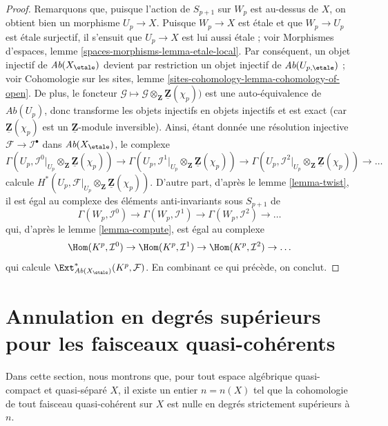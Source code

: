 \begin{proof}
Remarquons que, puisque l'action de $S_{p + 1}$ sur $W_p$ est au-dessus de $X$, on
obtient bien un morphisme $U_p \to X$. Puisque $W_p \to X$ est \'etale et que
$W_p \to U_p$ est \'etale surjectif, il s'ensuit
que $U_p \to X$ est lui aussi \'etale ; voir
Morphismes d'espaces, lemme \ref{spaces-morphisms-lemma-etale-local}.
Par conséquent, un objet injectif de
$\textit{Ab}(X_\etale)$ devient par restriction un objet injectif de
$\textit{Ab}(U_{p, \etale})$ ; voir
Cohomologie sur les sites, lemme \ref{sites-cohomology-lemma-cohomology-of-open}.
De plus, le foncteur
$\mathcal{G} \mapsto
\mathcal{G} \otimes_\mathbf{Z} \underline{\mathbf{Z}}(\chi_p))$
est une auto-équivalence de $\textit{Ab}(U_p)$, donc transforme les objets injectifs
en objets injectifs et est exact (car
$\underline{\mathbf{Z}}(\chi_p)$ est un
$\underline{\mathbf{Z}}$-module inversible). Ainsi, étant donnée une résolution injective
$\mathcal{F} \to \mathcal{I}^\bullet$ dans $\textit{Ab}(X_\etale)$,
le complexe
$$
\Gamma(U_p,
\mathcal{I}^0|_{U_p} \otimes_\mathbf{Z} \underline{\mathbf{Z}}(\chi_p))
\to
\Gamma(U_p,
\mathcal{I}^1|_{U_p} \otimes_\mathbf{Z} \underline{\mathbf{Z}}(\chi_p))
\to
\Gamma(U_p,
\mathcal{I}^2|_{U_p} \otimes_\mathbf{Z} \underline{\mathbf{Z}}(\chi_p))
\to \ldots
$$
calcule
$H^*(U_p,
\mathcal{F}|_{U_p} \otimes_\mathbf{Z} \underline{\mathbf{Z}}(\chi_p))$.
D'autre part, d'après
le lemme \ref{lemma-twist},
il est égal au complexe des éléments anti-invariants sous $S_{p + 1}$ de
$$
\Gamma(W_p, \mathcal{I}^0) \to
\Gamma(W_p, \mathcal{I}^1) \to
\Gamma(W_p, \mathcal{I}^2) \to \ldots
$$
qui, d'après
le lemme \ref{lemma-compute},
est égal au complexe
$$
\Hom(K^p, \mathcal{I}^0) \to
\Hom(K^p, \mathcal{I}^1) \to
\Hom(K^p, \mathcal{I}^2) \to \ldots
$$
qui calcule
$\Ext^*_{\textit{Ab}(X_\etale)}(K^p, \mathcal{F})$.
En combinant ce qui précède, on conclut.
\end{proof}





\section{Annulation en degrés supérieurs pour les faisceaux quasi-cohérents}
\label{section-higher-vanishing}

\noindent
Dans cette section, nous montrons que, pour tout espace algébrique quasi-compact et
quasi-séparé $X$, il existe un entier
$n = n(X)$ tel que la cohomologie de tout faisceau quasi-cohérent
sur $X$ est nulle en degrés strictement supérieurs à $n$.

